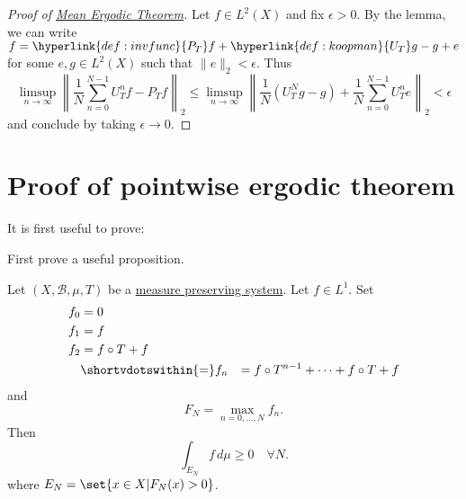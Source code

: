\documentclass{article}
\begin{document}
\begin{proof}[Proof of \hyperlink{thm:meanet}{Mean Ergodic Theorem}]
  Let $f \in L^2(X)$ and fix $\epsilon > 0$.
  By the lemma, we can write $f = \hyperlink{def:invfunc}{P_T} f + \hyperlink{def:koopman}{U_T} g - g + e$ for some $e, g \in L^2(X)$ such that $\|e\|_2 < \epsilon$.
  Thus
  \begin{equation*}
    \limsup_{n \to \infty} \left\|\frac{1}{N} \sum_{n=0}^{N-1} U_T^n f - P_T f\right\|_2 \leq \limsup_{n\to \infty} \left\lVert\frac{1}{N} \left(U_T^Ng - g\right) + \frac{1}{N} \sum_{n=0}^{N-1}U_T^ne\right\rVert_2 < \epsilon
  \end{equation*}
  and conclude by taking $\epsilon\to0$.
\end{proof}

\clearpage
\section{Proof of pointwise ergodic theorem}
It is first useful to prove:
First prove a useful proposition.
\begin{prop}
  Let $(X, \mathcal{B},\mu,T)$ be a \hyperlink{def:mps}{measure preserving system}.
  Let $f \in L^1$. Set
  \begin{align*}
    f_0 &= 0 \\
    f_1 &= f\\
    f_2 &= f \circ T + f \\
        &\shortvdotswithin{=}
    f_n &= f \circ T^{n-1} + \dotsb + f \circ T + f
  \end{align*}
  and
  \begin{equation*}
    F_N = \max_{n = 0, \dotsc, N} f_n.
  \end{equation*}
  Then
  \begin{equation*}
    \int_{E_N} f \, d \mu \geq 0 \quad \forall N.
  \end{equation*}
  where $E_N = \set{x \in X | F_N(x) > 0}$.
\end{prop}
\end{document}
